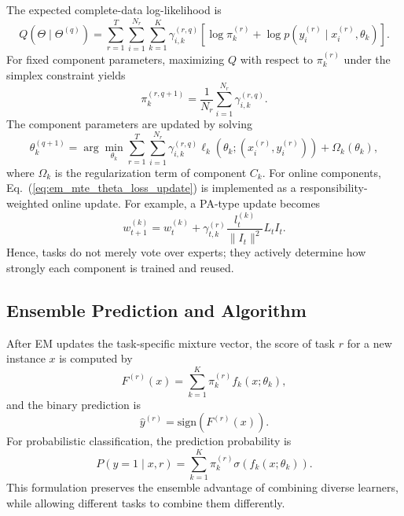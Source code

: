 \documentclass[12pt,a4paper]{article}
\begin{document}
	The expected complete-data log-likelihood is
	\begin{equation}
		Q(\Theta\mid\Theta^{(q)})
		=
		\sum_{r=1}^{T}\sum_{i=1}^{N_r}\sum_{k=1}^{K}
		\gamma_{i,k}^{(r,q)}
		\left[
		\log \pi_k^{(r)}
		+
		\log p\!\left(y_i^{(r)}\mid x_i^{(r)},\theta_k\right)
		\right].
		\label{eq:em_mte_q}
	\end{equation}
	For fixed component parameters, maximizing $Q$ with respect to $\pi_k^{(r)}$ under the simplex constraint yields
	\begin{equation}
		\pi_k^{(r,q+1)}
		=
		\frac{1}{N_r}
		\sum_{i=1}^{N_r}\gamma_{i,k}^{(r,q)} .
		\label{eq:em_mte_pi_update}
	\end{equation}
	The component parameters are updated by solving
	\begin{equation}
		\theta_k^{(q+1)}
		=
		\arg\min_{\theta_k}
		\sum_{r=1}^{T}\sum_{i=1}^{N_r}
		\gamma_{i,k}^{(r,q)}
		\ell_k\!\left(\theta_k;(x_i^{(r)},y_i^{(r)})\right)
		+
		\Omega_k(\theta_k),
		\label{eq:em_mte_theta_loss_update}
	\end{equation}
	where $\Omega_k$ is the regularization term of component $C_k$. For online components, Eq.~(\ref{eq:em_mte_theta_loss_update}) is implemented as a responsibility-weighted online update. For example, a PA-type update becomes
	\begin{equation}
		w_{t+1}^{(k)}
		=
		w_t^{(k)}
		+
		\gamma_{t,k}^{(r)}
		\frac{l_t^{(k)}}{\|I_t\|^2}
		L_t I_t .
		\label{eq:em_mte_weighted_pa}
	\end{equation}
	Hence, tasks do not merely vote over experts; they actively determine how strongly each component is trained and reused.
	
	\subsection{Ensemble Prediction and Algorithm}
	
	After EM updates the task-specific mixture vector, the score of task $r$ for a new instance $x$ is computed by
	\begin{equation}
		F^{(r)}(x)
		=
		\sum_{k=1}^{K}\pi_k^{(r)} f_k(x;\theta_k),
		\label{eq:em_mte_score}
	\end{equation}
	and the binary prediction is
	\begin{equation}
		\hat{y}^{(r)}
		=
		\mathrm{sign}\!\left(F^{(r)}(x)\right).
		\label{eq:em_mte_prediction}
	\end{equation}
	For probabilistic classification, the prediction probability is
	\begin{equation}
		P\!\left(y=1\mid x,r\right)
		=
		\sum_{k=1}^{K}\pi_k^{(r)}
		\sigma\!\left(f_k(x;\theta_k)\right).
		\label{eq:em_mte_probability}
	\end{equation}
	This formulation preserves the ensemble advantage of combining diverse learners, while allowing different tasks to combine them differently.
	
\end{document}
